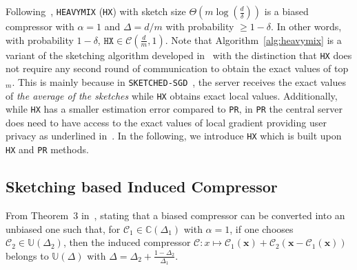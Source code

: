 \documentclass[sigconf, anonymous, review]{acmart}
\newtheorem{lemma}{Lemma}
\begin{document}
Following~\citep{ivkin2019communication}, \texttt{HEAVYMIX} (\texttt{HX}) with sketch size $\Theta\left(m\log\left(\frac{d}{\delta}\right)\right)$ is a biased compressor with $\alpha=1$ and  $\Delta=d/m$ with probability $\geq1-\delta$.
In other words, with probability $1-\delta$, $\texttt{HX}\in \mathcal{C}(\frac{d}{m},1)$. 
Note that Algorithm~\ref{alg:heavymix} is a variant of the sketching algorithm developed in~\cite{ivkin2019communication} with the distinction that \texttt{HX} does not require any second round of communication to obtain the exact values of top$_m$.
This is mainly because in \texttt{SKETCHED-SGD}~\citep{ivkin2019communication}, the server receives the exact values of \emph{the average of the sketches} while \texttt{HX} obtains exact local values.
Additionally, while \texttt{HX} has a smaller estimation error compared to \texttt{PR}, in \texttt{PR} the central server does need to have access to the exact values of local gradient providing user privacy as underlined in~\cite{li2019privacy}.
In the following, we introduce \texttt{HX} which is built upon \texttt{HX} and \texttt{PR} methods.


\subsection{Sketching based Induced Compressor}


From Theorem~$3$ in~\cite{horvath2020better}, stating that a biased compressor can be converted into an unbiased one such that, for $\mathcal{C}_1\in \mathbb{C}(\Delta_1)$ with $\alpha=1$, if one chooses $\mathcal{C}_2\in \mathbb{U}(\Delta_2)$, then the induced compressor $\mathcal{C}: x \mapsto \mathcal{C}_1(\mathbf{x})+\mathcal{C}_2\left(\mathbf{x}-\mathcal{C}_1\left(\mathbf{x}\right)\right)$ belongs to $\mathbb{U}(\Delta)$ with $\Delta=\Delta_2+\frac{1-\Delta_2}{\Delta_1}$. 
\end{document}
